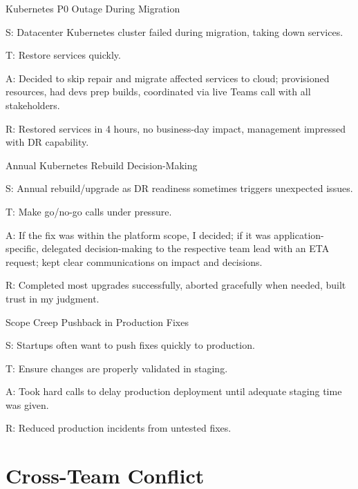 \documentclass[11pt]{article}
\begin{document}
\begin{starstory}{Kubernetes P0 Outage During Migration}
\begin{starlist}
\item[S:] Datacenter Kubernetes cluster failed during migration, taking down services.
\item[T:] Restore services quickly.
\item[A:] Decided to skip repair and migrate affected services to cloud; provisioned resources, had devs prep builds, coordinated via live Teams call with all stakeholders.
\item[R:] Restored services in 4 hours, no business-day impact, management impressed with DR capability.
\end{starlist}
\end{starstory}

\begin{starstory}{Annual Kubernetes Rebuild Decision-Making}
\begin{starlist}
\item[S:] Annual rebuild/upgrade as DR readiness sometimes triggers unexpected issues.
\item[T:] Make go/no-go calls under pressure.
\item[A:] If the fix was within the platform scope, I decided; if it was application-specific, delegated decision-making to the respective team lead with an ETA request; kept clear communications on impact and decisions.
\item[R:] Completed most upgrades successfully, aborted gracefully when needed, built trust in my judgment.
\end{starlist}
\end{starstory}

\begin{starstory}{Scope Creep Pushback in Production Fixes}
\begin{starlist}
\item[S:] Startups often want to push fixes quickly to production.
\item[T:] Ensure changes are properly validated in staging.
\item[A:] Took hard calls to delay production deployment until adequate staging time was given.
\item[R:] Reduced production incidents from untested fixes.
\end{starlist}
\end{starstory}

\section{Cross-Team Conflict}
\end{document}
